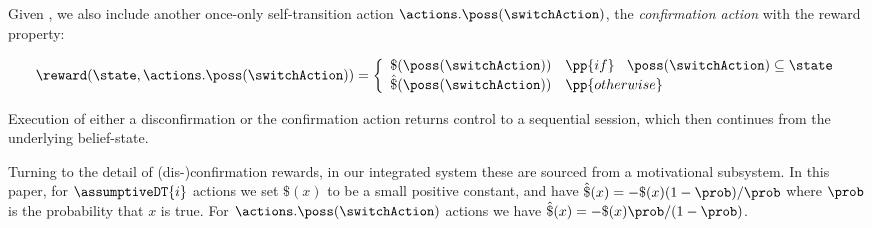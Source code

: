 Given \switchAction, we also include another once-only self-transition
action $\actions.\poss(\switchAction)$, the \emph{confirmation action}
with the reward property:

\[
\reward(\state, \actions.\poss(\switchAction)) = \bigg\{ \begin{array}{ll}
\$(\poss(\switchAction)) & \pp{if}~\;\; \poss(\switchAction) \subseteq \state \\
\hat\$(\poss(\switchAction)) & \pp{otherwise} \\
\end{array}
\]

Execution of either a disconfirmation or the confirmation action
returns control to a sequential session, which then continues from the
underlying belief-state.

Turning to the detail of (dis-)confirmation rewards, in our integrated
system these are sourced from a motivational subsystem. In this paper,
for $\assumptiveDT{i}$ actions we set $\$(x)$ to be a small positive
constant, and have $\hat\$(x)= - \$(x)(1 - \prob) /
\prob$ where $\prob$ is the probability that $x$ is true. For
$\actions.\poss(\switchAction)$ actions we have $\hat\$(x)= -
\$(x)\prob/(1-\prob)$.







